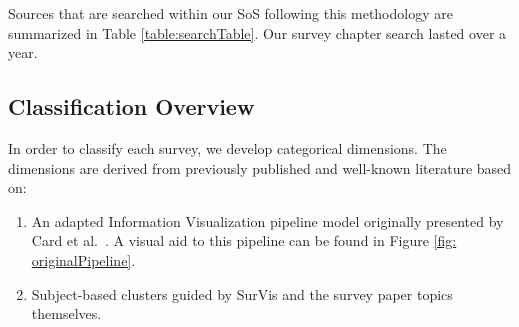 Sources that are searched within our SoS following this methodology are summarized in Table \ref{table:searchTable}. Our survey chapter search lasted over a year.


\subsection{Classification Overview}
In order to classify each survey, we develop categorical dimensions. The dimensions are derived from previously published and well-known literature based on: 
\begin{enumerate}
\item An adapted Information Visualization pipeline model originally presented by Card et al.\ \cite{card1999readings}. A visual aid to this pipeline can be found in Figure \ref{fig: originalPipeline}.
\item Subject-based clusters guided by SurVis \cite{beck2016visual} and the survey paper topics themselves.
\end{enumerate}
